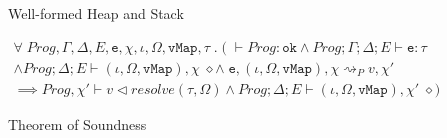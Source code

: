 \begin{figure}[H]
    \centering
    \begin{mathpar}
    \end{mathpar}
    \caption{Well-formed Heap and Stack}
    \label{fig:my_label}
\end{figure}

\begin{figure}[H]
    \centering
    \begin{multline*}
        \forall \; Prog, \Gamma, \Delta, E, \texttt{e}, \chi, \iota, \Omega, \texttt{vMap}, \tau \; . \; ( \; \vdash Prog : \texttt{ok} \land Prog; \Gamma; \Delta; E \vdash \texttt{e} : \tau \\ \land Prog; \Delta; E \vdash (\iota, \Omega, \texttt{vMap}), \chi \; \diamond
        \land \; \texttt{e}, (\iota, \Omega, \texttt{vMap}), \chi \rightsquigarrow_P v, \chi' \\ \implies Prog, \chi' \vdash v \triangleleft resolve(\tau, \Omega) \land Prog; \Delta; E \vdash (\iota, \Omega, \texttt{vMap}), \chi' \; \diamond)
    \end{multline*}
    \caption{Theorem of Soundness}
    \label{fig:genus-soundness}
\end{figure}
